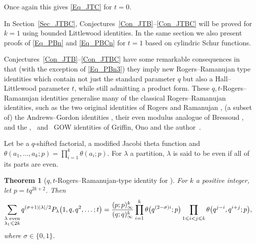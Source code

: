 \documentclass[pdftex]{sigma}
\numberwithin{equation}{section}
\newtheorem{Theorem}{Theorem}[section]
\renewcommand{\leq}{\leqslant}
\renewcommand{\geq}{\geqslant}
\newcommand{\abs}[1]{\vert#1\vert}
\newcommand{\la}{\lambda}
\begin{document}
Once again this gives \eqref{Eq_JTC} for $t=0$.



In Section~\ref{Sec_JTBC}, Conjectures~\ref{Con_JTB}--\ref{Con_JTBC}
will be proved for $k=1$ using bounded Littlewood identities.
In the same section we also present proofs of \eqref{Eq_PBn} and
\eqref{Eq_PBCn} for $t=1$ based on cylindric Schur functions.



Conjectures~\ref{Con_JTB}--\ref{Con_JTBC} have some remarkable
consequences in that (with the exception of \eqref{Eq_PBn3}) they
imply new Rogers--Ramanujan type identities which contain not just
the standard parameter $q$ but also a Hall--Littlewood parameter $t$,
while still admitting a product form.
These $q,t$\nobreakdash-Rogers--Ramanujan identities generalise many of the classical
Rogers--Ramanujan identities, such as the two original identities of Rogers
and Ramanujan \cite{Rogers94,Rogers17,RR19}, (a subset of) the
Andrews--Gordon identities \cite{Andrews74}, their even modulus
analogue of Bressoud \cite{Bressoud80,Bressoud80b}, and
the ,~ and~
GOW identities of Griffin, Ono and the author~\cite{GOW16}.

Let \smash{$(a;q)_{\infty}=\prod_{i\geq 0}\bigl(1-aq^i\bigr)$} be a $q$-shifted factorial,
 a modified Jacobi theta
function and $\theta(a_1,\dots,a_k;p)=\prod_{i=1}^k \theta(a_i;p)$.
For $\la$ a partition, $\la$ is said to be even if all of its parts
are even.

\begin{Theorem}[$q,t$-Rogers--Ramanujan-type identity
for ]\label{Thm_qtRR}
For $k$ a positive integer, let $p=tq^{2k+2}$.
Then
\begin{equation}\label{Eq_qt-one}
\sum_{\substack{\la\textup{ even} \\[1pt] \la_1\leq 2k}}
q^{(\sigma+1)\abs{\la}/2} P_{\la}\bigl(1,q,q^2,\dots;t\bigr)
=\frac{(p;p)_{\infty}^k}
{(q;q)_{\infty}^k}
\prod_{i=1}^k \theta\bigl(q^{(2-\sigma)i};p\bigr)
\prod_{1\leq i<j\leq k}
\theta\bigl(q^{j-i},q^{i+j};p\bigr),
\end{equation}
where $\sigma\in\{0,1\}$.
\end{Theorem}
\end{document}
